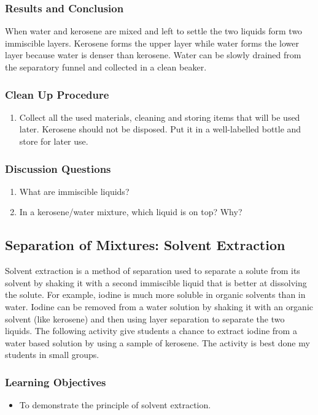 \subsubsection*{Results and Conclusion}
When water and kerosene are mixed and left to settle the two liquids form two immiscible layers. Kerosene forms the upper layer while water forms the lower layer because water is denser than kerosene. Water can be slowly drained from the separatory funnel and collected in a clean beaker.

\subsubsection*{Clean Up Procedure}
\begin{enumerate}
\item{Collect all the used materials, cleaning and storing items that will be used later. Kerosene should not be disposed. Put it in a well-labelled bottle and store for later use.}
\end{enumerate}

\subsubsection*{Discussion Questions}
\begin{enumerate}
\item{What are immiscible liquids?}
\item{In a kerosene/water mixture, which liquid is on top? Why?}
\end{enumerate}

\subsection{Separation of Mixtures: Solvent Extraction}

Solvent extraction is a method of separation used to separate a solute from its solvent by shaking it with a second immiscible liquid that is better at dissolving the solute. For example, iodine is much more soluble in organic solvents than in water. Iodine can be removed from a water solution by shaking it with an organic solvent (like kerosene) and then using layer separation to separate the two liquids.
The following activity give students a chance to extract iodine from a water based solution by using a sample of kerosene. The activity is best done my students in small groups.

\subsubsection*{Learning Objectives}
\begin{itemize}
\item{To demonstrate the principle of solvent extraction.}
\end{itemize}

